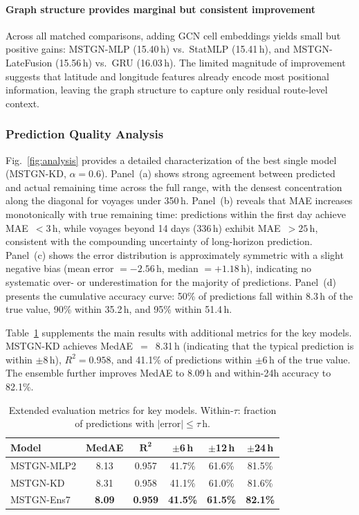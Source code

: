 \documentclass[conference]{IEEEtran}
\begin{document}
\paragraph{Graph structure provides marginal but consistent improvement}
Across all matched comparisons, adding GCN cell embeddings yields small but positive gains: MSTGN-MLP (15.40\,h) vs.\ StatMLP (15.41\,h), and MSTGN-LateFusion (15.56\,h) vs.\ GRU (16.03\,h).
The limited magnitude of improvement suggests that latitude and longitude features already encode most positional information, leaving the graph structure to capture only residual route-level context.

\subsubsection{Prediction Quality Analysis}

Fig.~\ref{fig:analysis} provides a detailed characterization of the best single model (MSTGN-KD, $\alpha{=}0.6$).
Panel~(a) shows strong agreement between predicted and actual remaining time across the full range, with the densest concentration along the diagonal for voyages under 350\,h.
Panel~(b) reveals that MAE increases monotonically with true remaining time: predictions within the first day achieve MAE~$< 3$\,h, while voyages beyond 14 days (336\,h) exhibit MAE~$> 25$\,h, consistent with the compounding uncertainty of long-horizon prediction.
Panel~(c) shows the error distribution is approximately symmetric with a slight negative bias (mean error $= -2.56$\,h, median $= +1.18$\,h), indicating no systematic over- or underestimation for the majority of predictions.
Panel~(d) presents the cumulative accuracy curve: 50\% of predictions fall within 8.3\,h of the true value, 90\% within 35.2\,h, and 95\% within 51.4\,h.

Table~\ref{tab:extended_metrics} supplements the main results with additional metrics for the key models.
MSTGN-KD achieves MedAE~$=$~8.31\,h (indicating that the typical prediction is within $\pm$8\,h), $R^2 = 0.958$, and 41.1\% of predictions within $\pm$6\,h of the true value.
The ensemble further improves MedAE to 8.09\,h and within-24h accuracy to 82.1\%.

\begin{table}[t]
    \centering
    \caption{Extended evaluation metrics for key models. Within-$\tau$: fraction of predictions with $|\text{error}| \leq \tau$\,h.}
    \label{tab:extended_metrics}
    \footnotesize
    \begin{tabular}{lccccc}
        \toprule
        \textbf{Model} & \textbf{MedAE} & $\boldsymbol{R^2}$ & \textbf{$\pm$6\,h} & \textbf{$\pm$12\,h} & \textbf{$\pm$24\,h} \\
        \midrule
        MSTGN-MLP2   & 8.13 & 0.957 & 41.7\% & 61.6\% & 81.5\% \\
        MSTGN-KD     & 8.31 & 0.958 & 41.1\% & 61.0\% & 81.6\% \\
        MSTGN-Ens7   & \textbf{8.09} & \textbf{0.959} & \textbf{41.5\%} & \textbf{61.5\%} & \textbf{82.1\%} \\
        \bottomrule
    \end{tabular}
\end{table}
\end{document}
